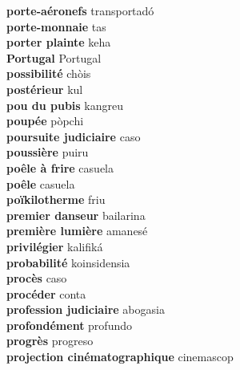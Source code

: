 \textbf{ porte-aéronefs  } transportadó \\
\textbf{ porte-monnaie  } tas \\
\textbf{ porter plainte  } keha \\
\textbf{ Portugal  } Portugal \\
\textbf{ possibilité  } chòis \\
\textbf{ postérieur  } kul \\
\textbf{ pou du pubis  } kangreu \\
\textbf{ poupée  } pòpchi \\
\textbf{ poursuite judiciaire  } caso \\
\textbf{ poussière  } puiru \\
\textbf{ poêle à frire  } casuela \\
\textbf{ poêle  } casuela \\
\textbf{ poïkilotherme  } friu \\
\textbf{ premier danseur  } bailarina \\
\textbf{ première lumière  } amanesé \\
\textbf{ privilégier  } kalifiká \\
\textbf{ probabilité  } koinsidensia \\
\textbf{ procès  } caso \\
\textbf{ procéder  } conta \\
\textbf{ profession judiciaire  } abogasia \\
\textbf{ profondément  } profundo \\
\textbf{ progrès  } progreso \\
\textbf{ projection cinématographique  } cinemascop \\
